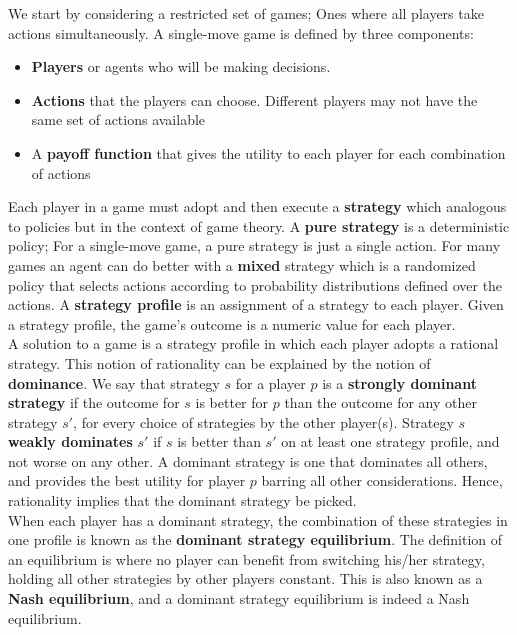 \documentclass[11pt]{article}
\begin{document}
We start by considering a restricted set of games; Ones where all players take actions simultaneously. A single-move game is defined by three components:

\begin{itemize}
    \item \textbf{Players} or agents who will be making decisions.
    \item \textbf{Actions} that the players can choose. Different players may not have the same set of actions available
    \item A \textbf{payoff function} that gives the utility to each player for each combination of actions
\end{itemize}

Each player in a game must adopt and then execute a \textbf{strategy} which analogous to policies but in the context of game theory. A \textbf{pure strategy} is a deterministic policy; For a single-move game, a pure strategy is just a single action. For many games an agent can do better with a \textbf{mixed} strategy which is a randomized policy that selects actions according to probability distributions defined over the actions. A \textbf{strategy profile} is an assignment of a strategy to each player. Given a strategy profile, the game's outcome is a numeric value for each player.\\

A solution to a game is a strategy profile in which each player adopts a rational strategy. This notion of rationality can be explained by the notion of \textbf{dominance}. We say that strategy $s$ for a player $p$ is a \textbf{strongly dominant strategy} if the outcome for $s$ is better for $p$ than the outcome for any other strategy $s'$, for every choice of strategies by the other player(s). Strategy $s$ \textbf{weakly dominates} $s'$ if $s$ is better than $s'$ on at least one strategy profile, and not worse on any other. A dominant strategy is one that dominates all others, and provides the best utility for player $p$ barring all other considerations. Hence, rationality implies that the dominant strategy be picked.\\

When each player has a dominant strategy, the combination of these strategies in one profile is known as the \textbf{dominant strategy equilibrium}. The definition of an equilibrium is where no player can benefit from switching his/her strategy, holding all other strategies by other players constant. This is also known as a \textbf{Nash equilibrium}, and a dominant strategy equilibrium is indeed a Nash equilibrium.\\
\end{document}
